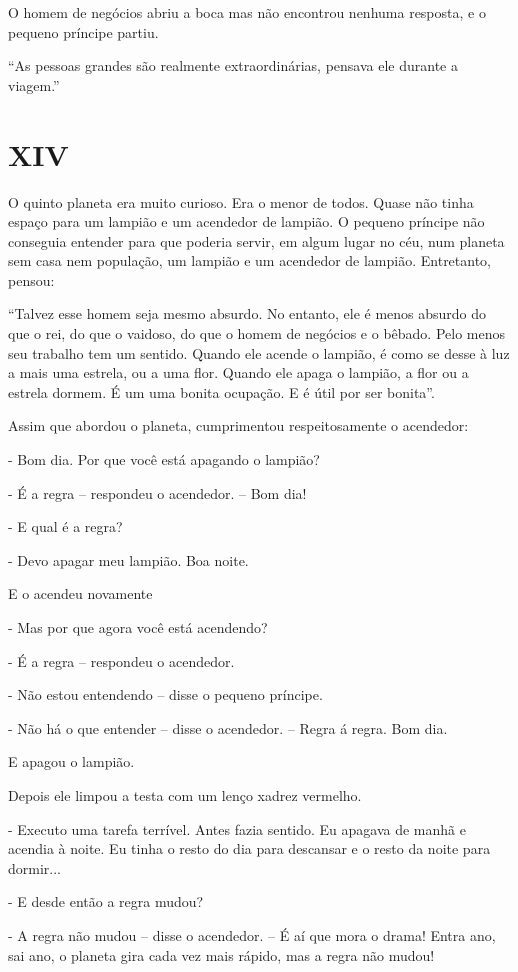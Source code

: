 O homem de negócios abriu a boca mas não encontrou nenhuma resposta, e o
pequeno príncipe partiu.

``As pessoas grandes são realmente extraordinárias, pensava ele durante
a viagem.''

\chapter{XIV}

O quinto planeta era muito curioso. Era o menor de todos. Quase não
tinha espaço para um lampião e um acendedor de lampião. O pequeno
príncipe não conseguia entender para que poderia servir, em algum lugar
no céu, num planeta sem casa nem população, um lampião e um acendedor de
lampião. Entretanto, pensou:

``Talvez esse homem seja mesmo absurdo. No entanto, ele é menos absurdo
do que o rei, do que o vaidoso, do que o homem de negócios e o bêbado.
Pelo menos seu trabalho tem um sentido. Quando ele acende o lampião, é
como se desse à luz a mais uma estrela, ou a uma flor. Quando ele apaga
o lampião, a flor ou a estrela dormem. É um uma bonita ocupação. E é
útil por ser bonita''.

Assim que abordou o planeta, cumprimentou respeitosamente o acendedor:

- Bom dia. Por que você está apagando o lampião?

- É a regra -- respondeu o acendedor. -- Bom dia!

- E qual é a regra?

- Devo apagar meu lampião. Boa noite.

E o acendeu novamente

- Mas por que agora você está acendendo?

- É a regra -- respondeu o acendedor.

- Não estou entendendo -- disse o pequeno príncipe.

- Não há o que entender -- disse o acendedor. -- Regra á regra. Bom dia.

E apagou o lampião.

Depois ele limpou a testa com um lenço xadrez vermelho.

- Executo uma tarefa terrível. Antes fazia sentido. Eu apagava de manhã
e acendia à noite. Eu tinha o resto do dia para descansar e o resto da
noite para dormir...

- E desde então a regra mudou?

- A regra não mudou -- disse o acendedor. -- É aí que mora o drama!
Entra ano, sai ano, o planeta gira cada vez mais rápido, mas a regra não
mudou!

